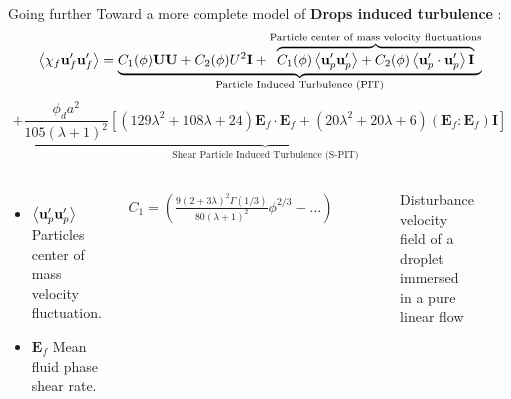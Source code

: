 \documentclass{sintefbeamer}
\begin{document}
\begin{frame}
  {Going further}
  Toward a more complete model of \textbf{Drops induced turbulence} : 
  \small
  \begin{equation*}
    \left<\chi_f  \textbf{u}_f' \textbf{u}_f'\right>
    =
    \underbrace{
      C_1(\phi)\textbf{UU}
    + C_2(\phi)U^2 \textbf{I}
    + \overbrace{C_1(\phi)\left<\textbf{u}_p'\textbf{u}_p'\right>
    + C_2(\phi)\left<\textbf{u}_{p}'\cdot \textbf{u}_{p}'\right>\textbf{I}
    }^{\text{Particle center of mass velocity fluctuations}}
    }_\text{Particle Induced Turbulence (PIT)}
  \end{equation*}
  \pause
  \begin{equation*}
    + \underbrace{\frac{\phi_d a^2 }{105 (\lambda +1)^2 }\left[
        (129\lambda^2+108\lambda+24)\textbf{E}_f\cdot \textbf{E}_f
        + (20\lambda^2 +20\lambda + 6)
        (\textbf{E}_f : \textbf{E}_f)\textbf{I}
    \right]}_\text{Shear Particle Induced Turbulence (S-PIT)}
\end{equation*}
\begin{columns}
  \begin{itemize}
    \item $\left<\textbf{u}_p'\textbf{u}_p'\right>$ Particles center of mass velocity fluctuation.  
    \item $\textbf{E}_f$ Mean fluid phase shear rate. 
  \end{itemize}
  \begin{align*}
    C_{1} = \left(\frac{9(2+3\lambda)^2 \Gamma(1/3)}{80 (\lambda +1)^2}\phi^{2/3} 
    - \ldots\right)\\
  \end{align*}
  \begin{figure}
    \caption{Disturbance velocity field of a droplet immersed in a pure linear flow}
  \end{figure}
  \includegraphics[width=0.6\textwidth]{image/Shear_Stokes.png}
\end{columns}
\end{frame}
\end{document}
